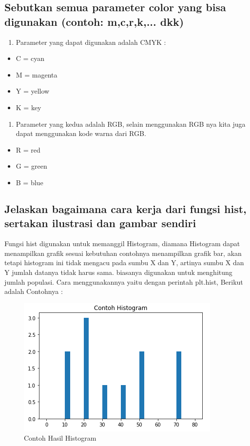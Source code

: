 \subsection{ Sebutkan semua parameter color yang bisa digunakan (contoh: m,c,r,k,... dkk)}
\begin{enumerate}
	\item Parameter yang dapat digunakan adalah CMYK :
\end{enumerate}
 
\begin{itemize}
	\item C = cyan
	\item M = magenta
	\item Y = yellow
	\item K = key
\end{itemize}

\begin{enumerate}
	\item Parameter yang kedua adalah RGB, selain menggunakan RGB nya kita juga dapat menggunakan kode warna dari RGB.
\end{enumerate}

\begin{itemize}
	\item R = red
	\item G = green
	\item B = blue
\end{itemize}

\subsection{Jelaskan bagaimana cara kerja dari fungsi hist, sertakan ilustrasi dan gambar sendiri}
Fungsi hist digunakan untuk memanggil Histogram, diamana Histogram dapat menampilkan grafik sesuai kebutuhan contohnya menampilkan grafik bar, akan tetapi histogram ini tidak mengacu pada sumbu X dan Y, artinya sumbu X dan Y jumlah datanya tidak harus sama. biasanya digunakan untuk menghitung jumlah populasi.\newline
	Cara menggunakannya yaitu dengan perintah plt.hist, Berikut adalah Contohnya :

	

\begin{figure}[h]
\centering
\includegraphics[scale=0.7]{figures/6/Teori/1174025/no3h.png}
\caption{Contoh Hasil Histogram}
\label{fig:contoh}
\end{figure}

